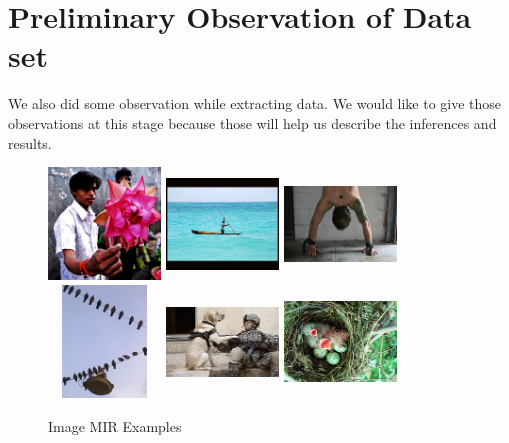 \section{Preliminary Observation of Data set}
We also did some observation while extracting data. We would like to give those observations at this stage because those will help us describe the inferences and results.\\
\begin{center}
\begin{figure}
\centering
\includegraphics[width=3cm, height=3cm]{./Pictures/MIR/1.jpg}
\includegraphics[width=3cm, height=3cm]{./Pictures/MIR/2.jpg}
\includegraphics[width=3cm, height=3cm]{./Pictures/MIR/3.jpg} \\
\includegraphics[width=3cm, height=3cm]{./Pictures/MIR/4.jpg}
\includegraphics[width=3cm, height=3cm]{./Pictures/MIR/5.jpg}
\includegraphics[width=3cm, height=3cm]{./Pictures/MIR/6.jpg}
\caption{Image MIR Examples}
\label{fig:Image MIR Examples}
\end{figure}
\end{center}
